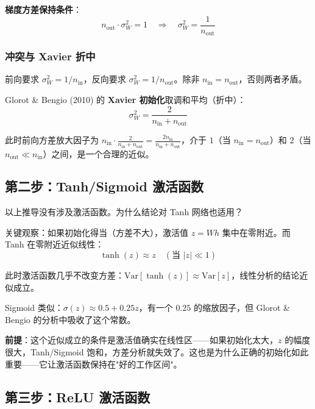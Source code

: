 \documentclass[12pt, a4paper]{ctexart}
\begin{document}
\textbf{梯度方差保持条件}：
\begin{equation}
    n_{\text{out}} \cdot \sigma_W^2 = 1 \quad \Rightarrow \quad \sigma_W^2 = \frac{1}{n_{\text{out}}}
\end{equation}

\subsubsection{冲突与 Xavier 折中}

前向要求 $\sigma_W^2 = 1/n_{\text{in}}$，反向要求 $\sigma_W^2 = 1/n_{\text{out}}$。除非 $n_{\text{in}} = n_{\text{out}}$，否则两者矛盾。

Glorot \& Bengio (2010) 的 \textbf{Xavier 初始化}取调和平均（折中）：
\begin{equation}
    \boxed{\sigma_W^2 = \frac{2}{n_{\text{in}} + n_{\text{out}}}}
\end{equation}

此时前向方差放大因子为 $n_{\text{in}} \cdot \frac{2}{n_{\text{in}}+n_{\text{out}}} = \frac{2n_{\text{in}}}{n_{\text{in}}+n_{\text{out}}}$，介于 $1$（当 $n_{\text{in}} = n_{\text{out}}$）和 $2$（当 $n_{\text{out}} \ll n_{\text{in}}$）之间，是一个合理的近似。

\subsection{第二步：Tanh/Sigmoid 激活函数}

以上推导没有涉及激活函数。为什么结论对 Tanh 网络也适用？

关键观察：如果初始化得当（方差不大），激活值 $z = W h$ 集中在零附近。而 Tanh 在零附近近似线性：
\begin{equation}
    \tanh(z) \approx z \quad (\text{当 } |z| \ll 1)
\end{equation}

此时激活函数几乎不改变方差：$\text{Var}[\tanh(z)] \approx \text{Var}[z]$，线性分析的结论近似成立。

Sigmoid 类似：$\sigma(z) \approx 0.5 + 0.25 z$，有一个 $0.25$ 的缩放因子，但 Glorot \& Bengio 的分析中吸收了这个常数。

\textbf{前提}：这个近似成立的条件是激活值确实在线性区——如果初始化太大，$z$ 的幅度很大，Tanh/Sigmoid 饱和，方差分析就失效了。这也是为什么正确的初始化如此重要——它让激活函数保持在"好的工作区间"。

\subsection{第三步：ReLU 激活函数}
\end{document}
